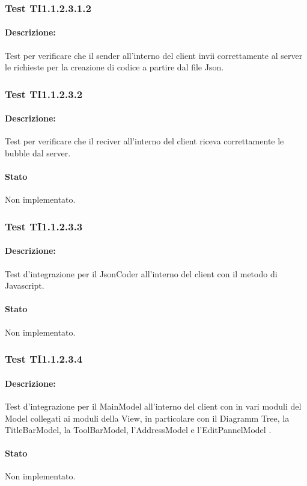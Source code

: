 \documentclass[../PianoDiQualifica.tex]{subfiles}
\begin{document}
	\subsubsection{Test TI1.1.2.3.1.2}
	\paragraph{Descrizione:} Test per verificare che il sender all'interno del client invii  correttamente al server le richieste per la creazione di codice a partire dal file Json.
	\subsubsection{Test TI1.1.2.3.2}
	\paragraph{Descrizione:} Test per verificare che il reciver all'interno del client riceva correttamente le bubble dal server.
	\paragraph{Stato} Non implementato.
	\subsubsection{Test TI1.1.2.3.3}
	\paragraph{Descrizione:} Test d'integrazione per il JsonCoder all'interno del client con il metodo  di Javascript. %
	\paragraph{Stato} Non implementato.
	\subsubsection{Test TI1.1.2.3.4}
	\paragraph{Descrizione:} Test d'integrazione per il MainModel all'interno del client con in vari moduli del Model collegati ai moduli della View, in particolare con il Diagramm Tree, la TitleBarModel, la ToolBarModel, l'AddressModel e l'EditPannelModel . 
	\paragraph{Stato} Non implementato.
\end{document}
